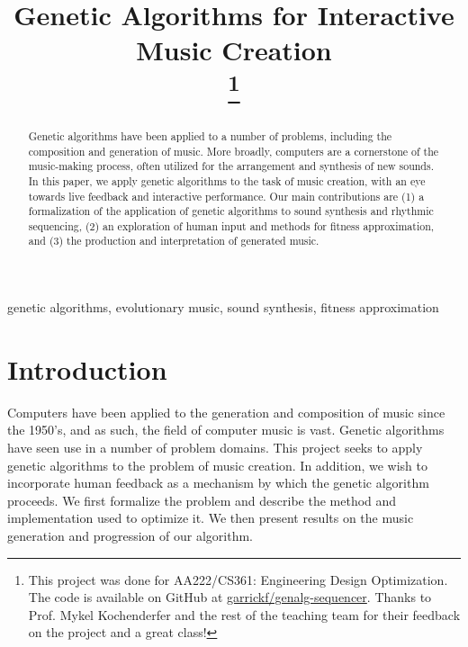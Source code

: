 \documentclass[conference]{IEEEtran}
\begin{document}
\title{Genetic Algorithms for Interactive Music Creation\\
    \thanks{This project was done for AA222/CS361: Engineering Design Optimization.
        The code is available on GitHub at
        \href{https://github.com/garrickf/genalg-sequencer}{garrickf/genalg-sequencer}.
        Thanks to Prof. Mykel Kochenderfer and the rest of the teaching team for their
        feedback on the project and a great class!}
}

\author{
}

\maketitle

\begin{abstract}
    Genetic algorithms have been applied to a number of problems, including the
    composition and generation of music. More broadly, computers are a cornerstone
    of the music-making process, often utilized for the arrangement and synthesis
    of new sounds. In this paper, we apply genetic algorithms to the task of music
    creation, with an eye towards live feedback and interactive performance. Our
    main contributions are (1) a formalization of the application of genetic
    algorithms to sound synthesis and rhythmic sequencing, (2) an exploration of
    human input and methods for fitness approximation, and (3) the production and
    interpretation of generated music.
\end{abstract}

\begin{IEEEkeywords}
    genetic algorithms, evolutionary music, sound synthesis, fitness approximation
\end{IEEEkeywords}

\section{Introduction}
Computers have been applied to the generation and composition of music since
the 1950's, and as such, the field of computer music is vast. Genetic
algorithms have seen use in a number of problem domains. This project seeks to
apply genetic algorithms to the problem of music creation. In addition, we wish
to incorporate human feedback as a mechanism by which the genetic algorithm
proceeds. We first formalize the problem and describe the method and
implementation used to optimize it. We then present results on the music
generation and progression of our algorithm.
\end{document}
